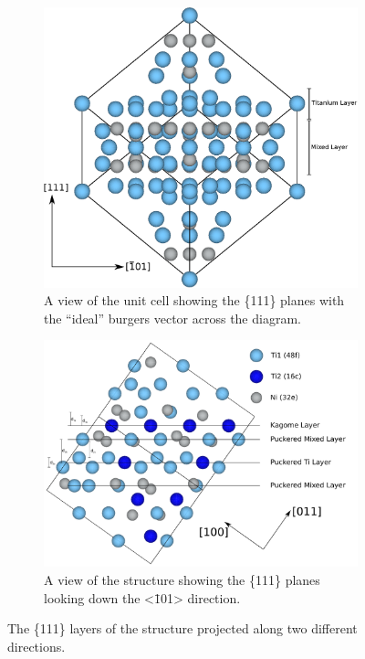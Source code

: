 \begin{figure}
\centering
\begin{subfigure}{0.65\textwidth}
\centering
\includegraphics[width=\textwidth]{Ti2Ni-slip_system}
\caption{A view of the  unit cell showing the \{111\} planes with the ``ideal'' burgers vector across the diagram.\label{fig:slip_system_Ti2Ni}}
\end{subfigure}

\begin{subfigure}{0.65\textwidth}
\centering
\includegraphics[width=\textwidth]{Ti2Ni-layers}
\caption{A view of the  structure showing the \{111\} planes looking down the <\=101> direction.\label{fig:Laves_phase_Ti2Ni_similarity}}
\end{subfigure}
\caption{The \{111\} layers of the  structure projected along two different directions.\label{fig:Ti2Ni_111_planes}}
\end{figure}

